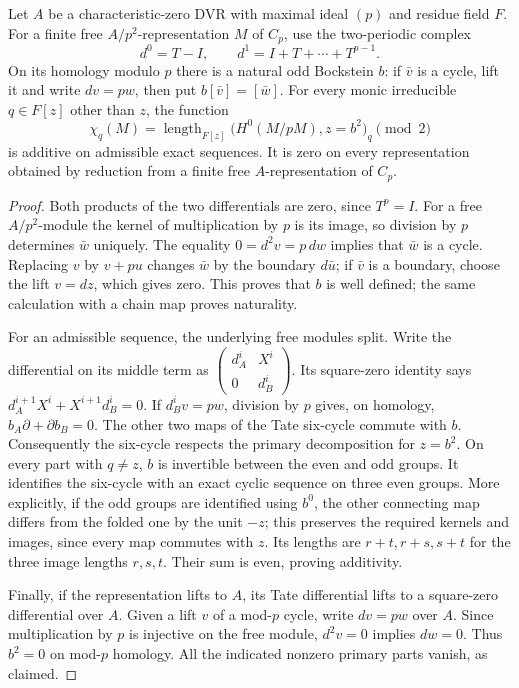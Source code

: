 \begin{lemma}
\label{C:modp2_Tate_Bockstein}
Let $A$ be a characteristic-zero DVR with maximal ideal $(p)$ and
residue field $F$. For a finite free $A/p^2$-representation $M$ of
$C_p$, use the two-periodic complex
\[
 d^0=T-I,\qquad d^1=I+T+\cdots+T^{p-1}.
\]
On its homology modulo $p$ there is a natural odd Bockstein $b$:
if $\bar v$ is a cycle, lift it and write $dv=pw$, then put
$b[\bar v]=[\bar w]$. For every monic irreducible
$q\in F[z]$ other than $z$, the function
\[
 \chi_q(M)=\operatorname{length}_{F[z]}
     \bigl(H^0(M/pM),z=b^2\bigr)_q\pmod2
\]
is additive on admissible exact sequences. It is zero on every
representation obtained by reduction from a finite free
$A$-representation of $C_p$.
\end{lemma}
\begin{proof}
Both products of the two differentials are zero, since $T^p=I$.
For a free $A/p^2$-module the kernel of multiplication by $p$ is
its image, so division by $p$ determines $\bar w$ uniquely.
The equality $0=d^2v=p\,dw$ implies that $\bar w$ is a cycle.
Replacing $v$ by $v+pu$ changes $\bar w$ by the boundary $d\bar u$;
if $\bar v$ is a boundary, choose the lift $v=dz$, which gives zero.
This proves that $b$ is well defined; the same calculation with a
chain map proves naturality.

For an admissible sequence, the underlying free modules split.
Write the differential on its middle term as
$\left(\begin{smallmatrix}d_A^i&X^i\\0&d_B^i\end{smallmatrix}\right)$.
Its square-zero identity says
$d_A^{i+1}X^i+X^{i+1}d_B^i=0$.
If $d_B^iv=pw$, division by $p$ gives, on homology,
$b_A\partial+\partial b_B=0$.
The other two maps of the Tate six-cycle commute with $b$.
Consequently the six-cycle respects the primary decomposition for
$z=b^2$. On every part with $q\ne z$, $b$ is invertible between
the even and odd groups. It identifies the six-cycle with an exact
cyclic sequence on three even groups. More explicitly, if the odd
groups are identified using $b^0$, the other connecting map differs
from the folded one by the unit $-z$; this preserves the required
kernels and images, since every map commutes with $z$. Its lengths are
$r+t,r+s,s+t$ for the three image lengths $r,s,t$.
Their sum is even, proving additivity.

Finally, if the representation lifts to $A$, its Tate differential
lifts to a square-zero differential over $A$. Given a lift $v$ of
a mod-$p$ cycle, write $dv=pw$ over $A$. Since multiplication by
$p$ is injective on the free module, $d^2v=0$ implies $dw=0$.
Thus $b^2=0$ on mod-$p$ homology. All the indicated nonzero primary
parts vanish, as claimed.
\end{proof}

